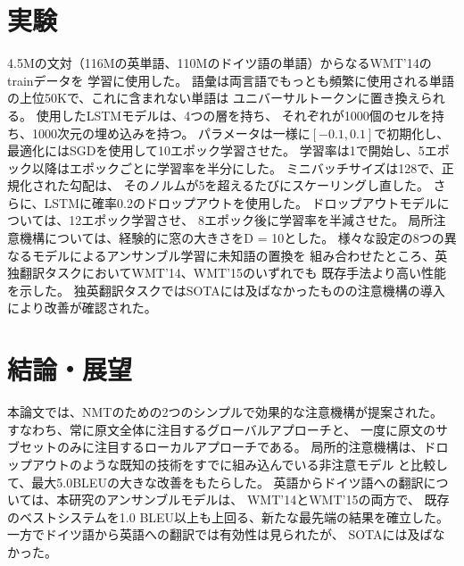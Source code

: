 \documentclass{jsarticle}
\begin{document}
\section{実験}
4.5Mの文対（116Mの英単語、110Mのドイツ語の単語）からなるWMT'14のtrainデータを
学習に使用した。
語彙は両言語でもっとも頻繁に使用される単語の上位50Kで、これに含まれない単語は
ユニバーサルトークンに置き換えられる。
使用したLSTMモデルは、4つの層を持ち、
それぞれが1000個のセルを持ち、1000次元の埋め込みを持つ。
パラメータは一様に$[-0.1, 0.1]$で初期化し、
最適化にはSGDを使用して10エポック学習させた。
学習率は1で開始し、5エポック以降はエポックごとに学習率を半分にした。
ミニバッチサイズは128で、正規化された勾配は、
そのノルムが5を超えるたびにスケーリングし直した。
さらに、LSTMに確率0.2のドロップアウトを使用した。
ドロップアウトモデルについては、12エポック学習させ、
8エポック後に学習率を半減させた。
局所注意機構については、経験的に窓の大きさをD = 10とした。
様々な設定の8つの異なるモデルによるアンサンブル学習に未知語の置換を
組み合わせたところ、英独翻訳タスクにおいてWMT’14、WMT’15のいずれでも
既存手法より高い性能を示した。
独英翻訳タスクではSOTAには及ばなかったものの注意機構の導入により改善が確認された。

\section{結論・展望}
本論文では、NMTのための2つのシンプルで効果的な注意機構が提案された。
すなわち、常に原文全体に注目するグローバルアプローチと、
一度に原文のサブセットのみに注目するローカルアプローチである。
局所的注意機構は、ドロップアウトのような既知の技術をすでに組み込んでいる非注意モデル
と比較して、最大5.0BLEUの大きな改善をもたらした。
英語からドイツ語への翻訳については、本研究のアンサンブルモデルは、
WMT'14とWMT'15の両方で、
既存のベストシステムを1.0 BLEU以上も上回る、新たな最先端の結果を確立した。
一方でドイツ語から英語への翻訳では有効性は見られたが、
SOTAには及ばなかった。


\end{document}
